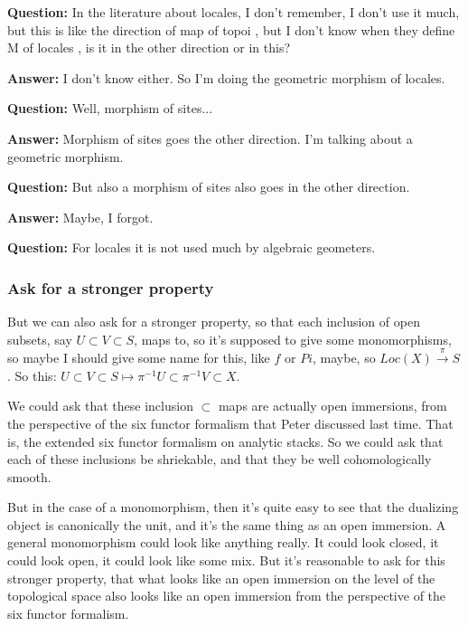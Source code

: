\textbf{Question:} In the literature about locales, I don't remember, I don't use it much, but this is like the direction of map of topoi \citeme{}, but I don't know when they define M of locales , is it in the other direction or in this? 

\textbf{Answer:} I don't know either. So I'm doing the geometric morphism of locales. 

\textbf{Question:} Well, morphism of sites...

\textbf{Answer:} Morphism of sites goes the other direction. I'm talking about a geometric morphism. 

\textbf{Question:} But also a morphism of sites  also goes in the other direction.

\textbf{Answer:} Maybe, I forgot.

\textbf{Question:} For locales it is not used much by algebraic geometers.

\subsubsection{Ask for a stronger property} \label{subsubsec:ask_for_a_stronger_property}
But we can also ask for a stronger property, so that each inclusion of open subsets, say $ U \subset V \subset S$, maps to, so it's supposed to give some monomorphisms, so maybe I should give some name for this, like $f$ or $Pi$, maybe, so $Loc(X) \xrightarrow{\pi} S$. So this: $

U \subset V \subset S \mapsto \pi^{-1} U \subset \pi^{-1} V \subset X

$. 

We could ask that these inclusion $\subset$ maps are actually open immersions, from the perspective of the six functor formalism that Peter discussed last time. That is, the extended six functor formalism on analytic stacks. So we could ask that each of these inclusions be shriekable, and that they be well cohomologically smooth.

But in the case of a monomorphism, then it's quite easy to see that the dualizing object is canonically the unit, and it's the same thing as an open immersion. 
A general monomorphism could look like anything really. It could look closed, it could look open, it could look like some mix. But it's reasonable to ask for this stronger property, that what looks like an open immersion on the level of the topological space also looks like an open immersion from the perspective of the six functor formalism.

